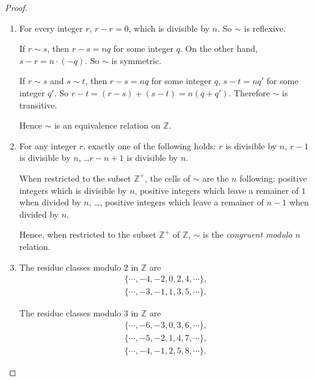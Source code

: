 \begin{proof}
    \begin{enumerate}
        \item For every integer $r$, $r - r = 0$, which is divisible by $n$. So $\sim$ is reflexive.

              If $r\sim s$, then $r - s = nq$ for some integer $q$. On the other hand, $s - r = n\cdot (-q)$. So $\sim$ is symmetric.

              If $r\sim s$ and $s\sim t$, then $r - s = nq$ for some integer $q$, $s - t = nq'$ for some integer $q'$. So $r - t = (r - s) + (s - t) = n(q + q')$. Therefore $\sim$ is transitive.

              Hence $\sim$ is an equivalence relation on $\mathbb{Z}$.
        \item For any integer $r$, exactly one of the following holds: $r$ is divisible by $n$, $r - 1$ is divisible by $n$, \ldots $r - n + 1$ is divisible by $n$.

              When restricted to the subset $\mathbb{Z}^{+}$, the cells of $\sim$ are the $n$ following: positive integers which is divisible by $n$, positive integers which leave a remainer of $1$ when divided by $n$, \ldots, positive integers which leave a remainer of $n-1$ when divided by $n$.

              Hence, when restricted to the subset $\mathbb{Z}^{+}$ of $\mathbb{Z}$, $\sim$ is the \textit{congruent modulo $n$} relation.
        \item The residue classes modulo $2$ in $\mathbb{Z}$ are
              \[
                  \begin{split}
                      \{ \cdots, -4, -2, 0, 2, 4, \cdots \}, \\
                      \{ \cdots, -3, -1, 1, 3, 5, \cdots \}.
                  \end{split}
              \]

              The residue classes modulo $3$ in $\mathbb{Z}$ are
              \[
                  \begin{split}
                      \{ \cdots, -6, -3, 0, 3, 6, \cdots \}, \\
                      \{ \cdots, -5, -2, 1, 4, 7, \cdots \}, \\
                      \{ \cdots, -4, -1, 2, 5, 8, \cdots \}.
                  \end{split}
              \]


\end{enumerate}
\end{proof}
